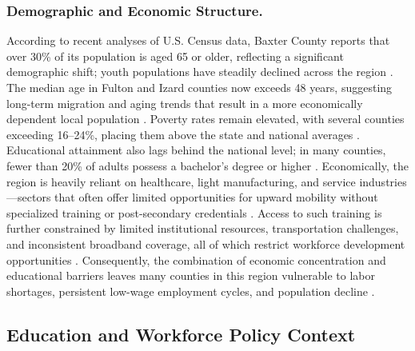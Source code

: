 \documentclass{llncs}
\begin{document}
\subsubsection{Demographic and Economic Structure.}\label{subsec:demographic}
According to recent analyses of U.S. Census data, Baxter County reports that over 30\% of its population is aged 65 or older, reflecting a significant demographic shift; youth populations have steadily declined across the region \cite{uscensus2023,arcompass2023}. The median age in Fulton and Izard counties now exceeds 48 years, suggesting long-term migration and aging trends that result in a more economically dependent local population \cite{uscensus2023}. Poverty rates remain elevated, with several counties exceeding 16--24\%, placing them above the state and national averages \cite{arkansasprofile2022}. Educational attainment also lags behind the national level; in many counties, fewer than 20\% of adults possess a bachelor’s degree or higher \cite{usdaedattain2022}. Economically, the region is heavily reliant on healthcare, light manufacturing, and service industries---sectors that often offer limited opportunities for upward mobility without specialized training or post-secondary credentials \cite{ardevelopment2022,arworkforcereport2023}. Access to such training is further constrained by limited institutional resources, transportation challenges, and inconsistent broadband coverage, all of which restrict workforce development opportunities \cite{arbroadband2023}. Consequently, the combination of economic concentration and educational barriers leaves many counties in this region vulnerable to labor shortages, persistent low-wage employment cycles, and population decline \cite{arworkforcereport2023}.

\subsection{Education and Workforce Policy Context}\label{subsec:Education}
\end{document}
